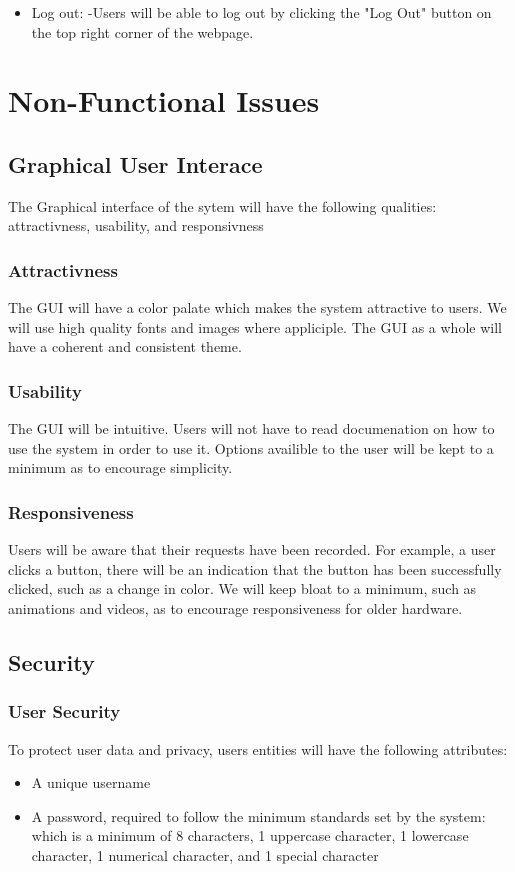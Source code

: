 \documentclass[letter, 12pt, titlepage]{article}
\begin{document}
\begin{itemize}
	\item Log out:
		-Users will be able to log out by clicking the "Log Out" button on the top right corner of the webpage.

	
	\end{itemize}	
		
		
	\section{Non-Functional Issues}

		\subsection{Graphical User Interace}
			The Graphical interface of the sytem will have the following qualities: attractivness, usability, and responsivness
			\subsubsection{Attractivness}
				The GUI will have a color palate which makes the system attractive to users. We will use high quality fonts and images where appliciple. The GUI as a whole will have a coherent and consistent theme. 
			\subsubsection{Usability}
				The GUI will be intuitive. Users will not have to read documenation on how to use the system in order to use it. Options availible to the user will be kept to a minimum as to encourage simplicity.
			\subsubsection{Responsiveness}
				Users will be aware that their requests have been recorded. For example, a user clicks a button, there will be an indication that the button has been successfully clicked, such as a change in color. We will keep bloat to a minimum, such as animations and videos, as to encourage responsiveness for older hardware.

		\subsection{Security}
			\subsubsection{User Security}
				To protect user data and privacy, users entities will have the following attributes:
				\begin{itemize}
						\item A unique username
						\item A password, required to follow the minimum standards set by the system: which is a minimum of 8 characters, 1 uppercase character, 1 lowercase character, 1 numerical character, and 1 special character
				\end{itemize}
\end{document}
